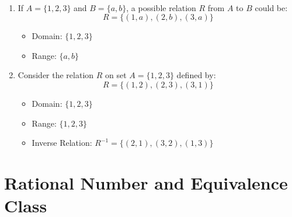 \begin{example}
	\ \begin{enumerate}
		\item If \( A = \{1, 2, 3\} \) and \( B = \{a, b\} \), a possible relation \( R \) from \( A \) to \( B \) could be:
		\[
		R = \{ (1, a), (2, b), (3, a) \}
		\]
		\begin{itemize}
			\item Domain: \(\{1, 2, 3\}\)
			\item Range: \(\{a, b\}\)
		\end{itemize}
		
		\item Consider the relation \( R \) on set \( A = \{1, 2, 3\} \) defined by:
		\[
		R = \{ (1, 2), (2, 3), (3, 1) \}
		\]
		\begin{itemize}
			\item Domain: \(\{1, 2, 3\}\)
			\item Range: \(\{1, 2, 3\}\)
			\item Inverse Relation: \( R^{-1} = \{ (2, 1), (3, 2), (1, 3) \} \)
		\end{itemize}
	\end{enumerate}
\end{example}

\section{Rational Number and Equivalence Class}

